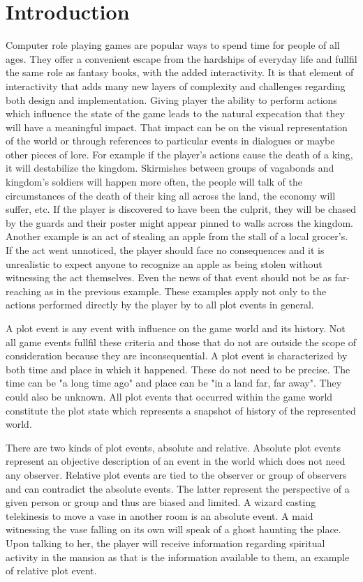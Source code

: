 
\chapter*{Introduction}

Computer role playing games are popular ways to spend time for people of all ages.
They offer a convenient escape from the hardships of everyday life and fullfil the same role as fantasy books, with the added interactivity.
It is that element of interactivity that adds many new layers of complexity and challenges regarding both design and implementation.
Giving player the ability to perform actions which influence the state of the game leads to the natural expecation that they will have a meaningful impact.
That impact can be on the visual representation of the world or through references to particular events in dialogues or maybe other pieces of lore.
For example if the player's actions cause the death of a king, it will destabilize the kingdom.
Skirmishes between groups of vagabonds and kingdom's soldiers will happen more often, the people will talk of the circumstances of the death of their king all across the land, the economy will suffer, etc.
If the player is discovered to have been the culprit, they will be chased by the guards and their poster might appear pinned to walls across the kingdom.
Another example is an act of stealing an apple from the stall of a local grocer's.
If the act went unnoticed, the player should face no consequences and it is unrealistic to expect anyone to recognize an apple as being stolen without witnessing the act themselves.
Even the news of that event should not be as far-reaching as in the previous example.
These examples apply not only to the actions performed directly by the player by to all plot events in general.

A plot event is any event with influence on the game world and its history.
Not all game events fullfil these criteria and those that do not are outside the scope of consideration because they are inconsequential.
A plot event is characterized by both time and place in which it happened.
These do not need to be precise.
The time can be "a long time ago" and place can be "in a land far, far away".
They could also be unknown.
All plot events that occurred within the game world constitute the plot state which represents a snapshot of history of the represented world.

There are two kinds of plot events, absolute and relative.
Absolute plot events represent an objective description of an event in the world which does not need any observer.
Relative plot events are tied to the observer or group of observers and can contradict the absolute events.
The latter represent the perspective of a given person or group and thus are biased and limited.
A wizard casting telekinesis to move a vase in another room is an absolute event.
A maid witnessing the vase falling on its own will speak of a ghost haunting the place.
Upon talking to her, the player will receive information regarding spiritual activity in the mansion as that is the information available to them, an example of relative plot event.

